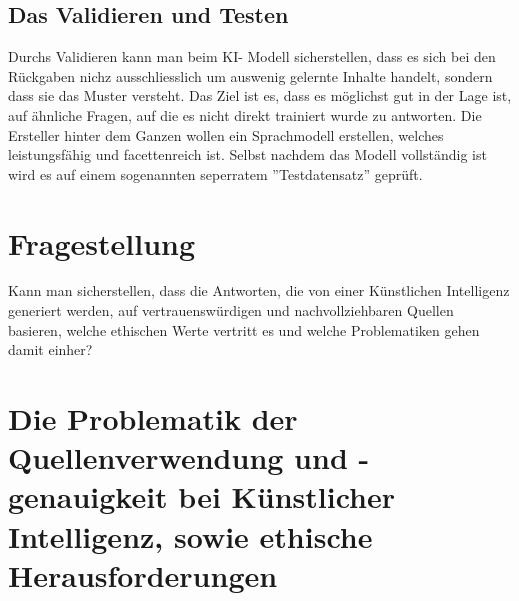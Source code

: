\documentclass{report}
\begin{document}
\subsection{Das Validieren und Testen}
Durchs Validieren kann man beim KI- Modell sicherstellen, dass es sich bei den Rückgaben nichz ausschliesslich um auswenig gelernte Inhalte handelt, sondern dass sie das Muster versteht. Das Ziel ist es, dass es möglichst gut in der Lage ist, auf ähnliche Fragen, auf die es nicht direkt trainiert wurde zu antworten. Die Ersteller hinter dem Ganzen wollen ein Sprachmodell erstellen, welches leistungsfähig und facettenreich ist. Selbst nachdem das Modell vollständig ist wird es auf einem sogenannten seperratem ''Testdatensatz'' geprüft.


\section{Fragestellung}
Kann man sicherstellen, dass die Antworten, die von einer Künstlichen Intelligenz generiert werden, auf vertrauenswürdigen und nachvollziehbaren Quellen basieren, welche ethischen Werte vertritt es und welche Problematiken gehen damit einher?

\section{Die Problematik der Quellenverwendung und -genauigkeit bei Künstlicher Intelligenz, sowie ethische Herausforderungen}
\end{document}
